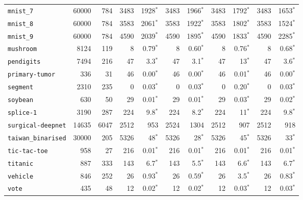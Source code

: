 \begin{tabular}{lccrrrrrrrr}
\texttt{mnist\_7} & \multicolumn{1}{r}{60000} & \multicolumn{1}{r}{784}  & 3483 & 1928$^*$ & 3483 & 1966$^*$ & 3483 & 1792$^*$ & 3483 & 1653$^*$\\
\texttt{mnist\_8} & \multicolumn{1}{r}{60000} & \multicolumn{1}{r}{784}  & 3583 & 2061$^*$ & 3583 & 1922$^*$ & 3583 & 1802$^*$ & 3583 & 1524$^*$\\
\texttt{mnist\_9} & \multicolumn{1}{r}{60000} & \multicolumn{1}{r}{784}  & 4590 & 2039$^*$ & 4590 & 1895$^*$ & 4590 & 1833$^*$ & 4590 & 2285$^*$\\
\texttt{mushroom} & \multicolumn{1}{r}{8124} & \multicolumn{1}{r}{119}  & 8 & 0.79$^*$ & 8 & 0.60$^*$ & 8 & 0.76$^*$ & 8 & 0.68$^*$\\
\texttt{pendigits} & \multicolumn{1}{r}{7494} & \multicolumn{1}{r}{216}  & 47 & 3.3$^*$ & 47 & 3.1$^*$ & 47 & 13$^*$ & 47 & 3.6$^*$\\
\texttt{primary-tumor} & \multicolumn{1}{r}{336} & \multicolumn{1}{r}{31}  & 46 & 0.00$^*$ & 46 & 0.00$^*$ & 46 & 0.01$^*$ & 46 & 0.00$^*$\\
\texttt{segment} & \multicolumn{1}{r}{2310} & \multicolumn{1}{r}{235}  & 0 & 0.03$^*$ & 0 & 0.03$^*$ & 0 & 0.20$^*$ & 0 & 0.03$^*$\\
\texttt{soybean} & \multicolumn{1}{r}{630} & \multicolumn{1}{r}{50}  & 29 & 0.01$^*$ & 29 & 0.01$^*$ & 29 & 0.03$^*$ & 29 & 0.02$^*$\\
\texttt{splice-1} & \multicolumn{1}{r}{3190} & \multicolumn{1}{r}{287}  & 224 & 9.8$^*$ & 224 & 8.2$^*$ & 224 & 11$^*$ & 224 & 9.8$^*$\\
\texttt{surgical-deepnet} & \multicolumn{1}{r}{14635} & \multicolumn{1}{r}{6047}  & 2512 & 953 & 2524 & 1304 & 2512 & 907 & 2512 & 918\\
\texttt{taiwan\_binarised} & \multicolumn{1}{r}{30000} & \multicolumn{1}{r}{205}  & 5326 & 48$^*$ & 5326 & 28$^*$ & 5326 & 45$^*$ & 5326 & 33$^*$\\
\texttt{tic-tac-toe} & \multicolumn{1}{r}{958} & \multicolumn{1}{r}{27}  & 216 & 0.01$^*$ & 216 & 0.01$^*$ & 216 & 0.01$^*$ & 216 & 0.01$^*$\\
\texttt{titanic} & \multicolumn{1}{r}{887} & \multicolumn{1}{r}{333}  & 143 & 6.7$^*$ & 143 & 5.5$^*$ & 143 & 6.6$^*$ & 143 & 6.7$^*$\\
\texttt{vehicle} & \multicolumn{1}{r}{846} & \multicolumn{1}{r}{252}  & 26 & 0.93$^*$ & 26 & 0.59$^*$ & 26 & 3.5$^*$ & 26 & 0.83$^*$\\
\texttt{vote} & \multicolumn{1}{r}{435} & \multicolumn{1}{r}{48}  & 12 & 0.02$^*$ & 12 & 0.02$^*$ & 12 & 0.03$^*$ & 12 & 0.03$^*$\\

\end{tabular}
